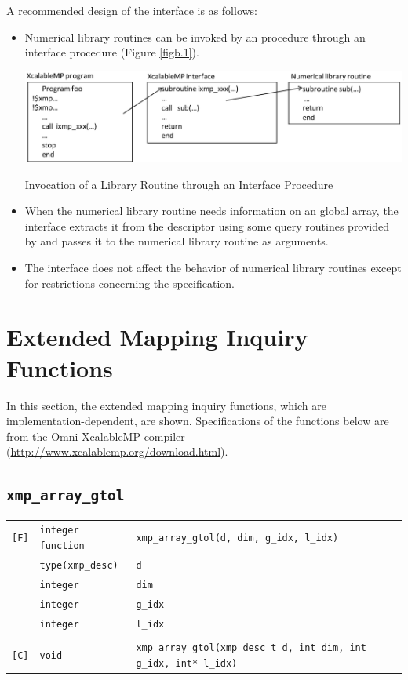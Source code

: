 A recommended design of the interface is as follows:

\begin{itemize}

 \item Numerical library routines can be invoked by an {\XMP} procedure
       through an interface procedure (Figure \ref{figb.1}).

 \begin{myfigure}
  \includegraphics[scale=0.45]{figs/figb.1.eps}
  \caption{Invocation of a Library Routine through an Interface Procedure}
  \label{figb.1}
 \end{myfigure}

 \item When the numerical library routine needs information on an global
       array, the interface extracts it from the descriptor using some
       query routines provided by {\XMP} and passes it to the
       numerical library routine as arguments.
%
 \item The interface does not affect the behavior of numerical library
       routines except for restrictions concerning the {\XMP}
       specification.
\end{itemize}


\section{Extended Mapping Inquiry Functions}

In this section, the extended mapping inquiry functions, which are
implementation-dependent, are shown.
Specifications of the functions below are from the Omni XcalableMP
compiler (\url{http://www.xcalablemp.org/download.html}).

\subsection{\tt xmp\_array\_gtol} \label{subsec:xmparraygtol}

\begin{tabular}{lll}

\verb![F]!& {\tt integer function} & {\tt xmp\_array\_gtol(d, dim, g\_idx, l\_idx)} \\
          & {\tt type(xmp\_desc)} & {\tt d}\\
          & {\tt integer} & {\tt dim}\\
          & {\tt integer} & {\tt g\_idx}\\
          & {\tt integer} & {\tt l\_idx}\\
          & & \\
\verb![C]!&  {\tt void} & {\tt xmp\_array\_gtol(xmp\_desc\_t d, int dim, int g\_idx, int* l\_idx)}

\end{tabular}

